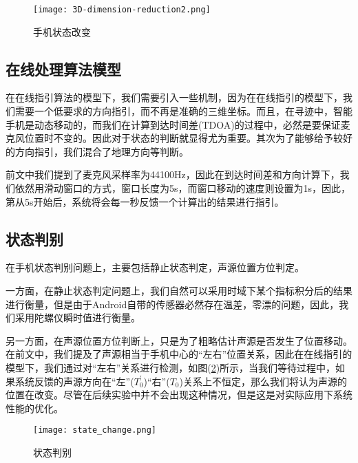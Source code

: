 \documentclass[winfonts]{njuthesis}
\begin{document}
			\begin{figure}[H]
				\centering
				\texttt{[image: 3D-dimension-reduction2.png]} 
				\caption{{手机状态改变}}
				\label{fig: 3D-dimension-reduction2}
			\end{figure}	
		
		\subsection{在线处理算法模型}
			
			在在线指引算法的模型下，我们需要引入一些机制，因为在在线指引的模型下，我们需要一个低要求的方向指引，而不再是准确的三维坐标。而且，在寻迹中，智能手机是动态移动的，而我们在计算到达时间差(TDOA)的过程中，必然是要保证麦克风位置时不变的。因此对于状态的判断就显得尤为重要。其次为了能够给予较好的方向指引，我们混合了地理方向等判断。
			
			前文中我们提到了麦克风采样率为44100Hz，因此在到达时间差和方向计算下，我们依然用滑动窗口的方式，窗口长度为5s，而窗口移动的速度则设置为1s，因此，第从5s开始后，系统将会每一秒反馈一个计算出的结果进行指引。
			
		\subsection{状态判别}
		
			在手机状态判别问题上，主要包括静止状态判定，声源位置方位判定。
			
			一方面，在静止状态判定问题上，我们自然可以采用时域下某个指标积分后的结果进行衡量，但是由于Android自带的传感器必然存在温差，零漂的问题，因此，我们采用陀螺仪瞬时值进行衡量。
			
			另一方面，在声源位置方位判断上，只是为了粗略估计声源是否发生了位置移动。在前文中，我们提及了声源相当于手机中心的“左右”位置关系，因此在在线指引的模型下，我们通过对“左右”关系进行检测，如图(\ref{fig: state-change})所示，当我们等待过程中，如果系统反馈的声源方向在“左”($T_0^{'}$)“右”($T_0$)关系上不恒定，那么我们将认为声源的位置在改变。尽管在后续实验中并不会出现这种情况，但是这是对实际应用下系统性能的优化。
			
			\begin{figure}[H]
				\centering
				\texttt{[image: state\_change.png]} 
				\caption{{状态判别}}
				\label{fig: state-change}
			\end{figure}	
						
\end{document}
